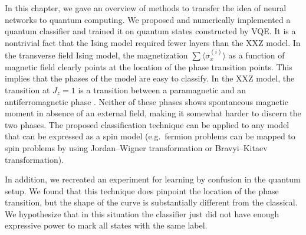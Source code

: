 In this chapter, we gave an overview of methods to transfer the idea of neural networks to quantum computing. We proposed and numerically implemented a quantum classifier and trained it on quantum states constructed by VQE. 
It is a nontrivial fact that the Ising model required fewer layers than the XXZ model. In the transverse field Ising model, the magnetization $\sum \langle \sigma_x^{(i)} \rangle$ as a function of magnetic field clearly points at the location of the phase transition points. This implies that the phases of the model are easy to classify. In the XXZ model, the transition at $J_z=1$ is a transition between a paramagnetic and an antiferromagnetic phase \cite{franchini_introduction_2017}. Neither of these phases shows spontaneous magnetic moment in absence of an external field, making it somewhat harder to discern the two phases. 
The proposed classification technique can be applied to any model that can be expressed as a spin model (e.g.~fermion problems can be mapped to spin problems by using Jordan--Wigner transformation or Bravyi--Kitaev transformation).

In addition, we recreated an experiment for learning by confusion \cite{van_nieuwenburg_learning_2017} in the quantum setup. We found that this technique does pinpoint the location of the phase transition, but the shape of the curve is substantially different from the classical. We hypothesize that in this situation the classifier just did not have enough expressive power to mark all states with the same label.

